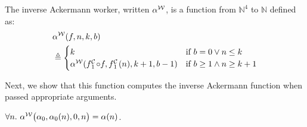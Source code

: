 \begin{defn} \label{defn: inv-ack-worker}
	The inverse Ackermann worker, written $\alpha^{\mathcal{W}}$, is a function from $\mathbb{N}^4$ to $\mathbb{N}$ defined as: %
	\begin{equation} \label{eq: inv-ack-worker-recursion}
	\begin{aligned}
	& \alpha^{\W}(f, n, k, b) \\ 
	& \triangleq \begin{cases}
	k & \text{if } b = 0 \vee n\le k \\ \alpha^{\W}(\cdt{f}{1}\circ f , \cdt{f}{1}(n), k+1, b-1) & \text{if } b \ge 1 \wedge n \ge k+1
	\end{cases}
		\end{aligned}
	\end{equation}
\end{defn}
\noindent Next, we show that this function computes the inverse Ackermann function when passed appropriate arguments.
\begin{thm} \label{thm: inv-ack-worker-correct}
	\href{https://github.com/inv-ack/inv-ack/blob/7270e64a2600b771f2b1b1b151f7d13fb2ae6c97/inv_ack.v#L199-L231}{\color{blue}\coq}
	$\forall n.~\alpha^{\mathcal{W}}\big(\alpha_0, \alpha_0(n), 0, n\big) = \alpha(n)$.
\end{thm}

